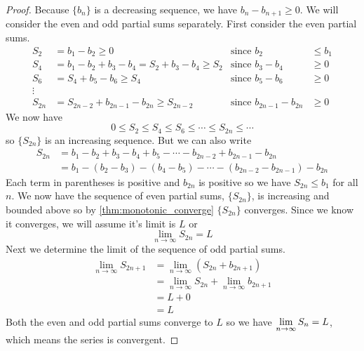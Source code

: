 \begin{proof}
Because $\{b_n\}$ is a decreasing sequence, we have $b_n-b_{n+1}\geq 0$. 
We will consider the even and odd partial sums separately. First consider the even partial sums.
\begin{align*}
S_2&=b_1-b_2\geq 0  &\text{since } b_2&\leq b_1\\
S_4&=b_1-b_2+b_3-b_4=S_2+b_3-b_4\geq S_2 &\text{since } b_3- b_4&\geq 0\\
S_6&=S_4+b_5-b_6\geq S_4 &\text{since } b_5- b_6&\geq 0\\
\vdots \\
S_{2n}&=S_{2n-2}+b_{2n-1}-b_{2n}\geq S_{2n-2}  &\text{since } b_{2n-1}- b_{2n}&\geq 0
\end{align*}
We now have
\[0\leq S_2\leq S_4\leq S_6\leq  \dotsb \leq S_{2n}\leq \dotsb\]
so $\{S_{2n}\}$ is an increasing sequence. 
But we can also write 
\begin{align*}
S_{2n}&=b_1-b_2+b_3-b_4+b_5-\dotsb -b_{2n-2}+b_{2n-1}-b_{2n}\\
&=b_1-(b_2-b_3)-(b_4-b_5)-\dotsb -(b_{2n-2}-b_{2n-1})-b_{2n}
\end{align*}
Each term in parentheses is positive and $b_{2n}$ is positive so we have $S_{2n}\leq b_1$ for all $n$. We now have the sequence of even partial sums, $\{S_{2n}\}$, is increasing and bounded above so by \autoref{thm:monotonic_converge}
 $\{S_{2n}\}$ converges. Since we know it converges, we will assume it's limit is $L$ or
\[\lim_{n\to \infty}S_{2n}=L\]
Next we determine the limit of the sequence of odd partial sums.
\begin{align*}
\lim_{n\to \infty}S_{2n+1}&=\lim_{n\to \infty}(S_{2n}+b_{2n+1})\\
&=\lim_{n\to \infty}S_{2n}+\lim_{n\to \infty}b_{2n+1}\\
&=L+0\\
&=L
\end{align*}
Both the even and odd partial sums converge to $L$ so we have $\displaystyle \lim_{n\to \infty}S_n=L$, which means the series is convergent.
\end{proof}


